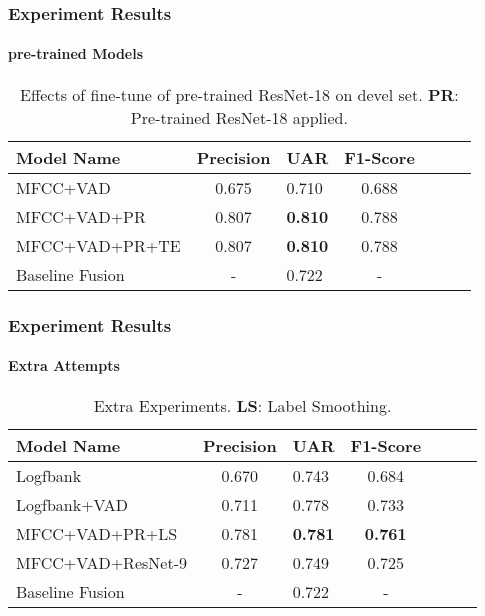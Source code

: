 \documentclass[
	11pt, %
]{beamer}
\begin{document}

\begin{frame}
	\frametitle{Experiment Results}
	\framesubtitle{pre-trained Models}
	
    \begin{table}[t]
      \caption{Effects of fine-tune of pre-trained ResNet-18 on devel set. \textbf{PR}: Pre-trained ResNet-18 applied. }
      \label{tab:TL}
      \centering
      \begin{tabular}{ lclclcl }
        \toprule
        Model Name & Precision & UAR    & F1-Score      \\
        \midrule
        MFCC+VAD            & 0.675   & 0.710   & 0.688   \\
        MFCC+VAD+PR         & 0.807   & \textbf{0.810}   & 0.788   \\
        MFCC+VAD+PR+TE  & 0.807   & \textbf{0.810}   & 0.788   \\
        Baseline Fusion    & -       & 0.722   & - \\
        \bottomrule
      \end{tabular}
    \end{table}
\end{frame}


\begin{frame}
	\frametitle{Experiment Results}
	\framesubtitle{Extra Attempts}
	
    \begin{table}[t]
      \caption{Extra Experiments. \textbf{LS}: Label Smoothing. }
      \label{tab:OtherExperiments}
      \centering
      \begin{tabular}{ lclclcl }
        \toprule
        Model Name & Precision & UAR    & F1-Score      \\
        \midrule
        Logfbank            & 0.670   & 0.743   & 0.684   \\
        Logfbank+VAD        & 0.711   & 0.778   & 0.733 \\
        MFCC+VAD+PR+LS      & 0.781   & \textbf{0.781}   & \textbf{0.761} \\
        MFCC+VAD+ResNet-9   & 0.727   & 0.749   & 0.725   \\
        Baseline Fusion     & -       & 0.722   & - \\
        \bottomrule
      \end{tabular}
    \end{table}
\end{frame}
\end{document}
